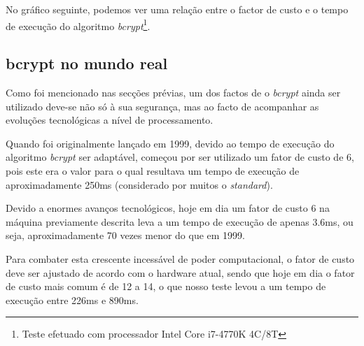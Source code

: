 \newpage
No gráfico seguinte, podemos ver uma relação entre o factor de custo e o tempo de execução do algoritmo \emph{bcrypt}\footnote{Teste efetuado com processador Intel Core i7-4770K 4C/8T}.

\begin{center}
\end{center}

\subsection{bcrypt no mundo real}

Como foi mencionado nas secções prévias, um dos factos de o \emph{bcrypt} ainda ser utilizado deve-se não só à sua segurança, mas ao facto de acompanhar as evoluções tecnológicas a nível de processamento.

Quando foi originalmente lançado em 1999, devido ao tempo de execução do algoritmo \emph{bcrypt} ser adaptável, começou por ser utilizado um fator de custo de 6, pois este era o valor para o qual resultava um tempo de execução de aproximadamente 250ms (considerado por muitos o \emph{standard}).

Devido a enormes avanços tecnológicos, hoje em dia um fator de custo 6 na máquina previamente descrita leva a um tempo de execução de apenas 3.6ms, ou seja, aproximadamente 70 vezes menor do que em 1999.

Para combater esta crescente incessável de poder computacional, o fator de custo deve ser ajustado de acordo com o hardware atual, sendo que hoje em dia o fator de custo mais comum é de 12 a 14, o que nosso teste levou a um tempo de execução entre 226ms e 890ms.

